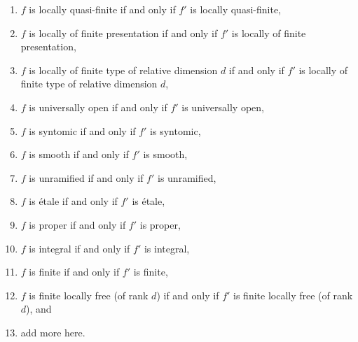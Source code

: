\begin{lemma}
\begin{enumerate}
$f$ is locally of finite type if and only if $f'$ is locally of finite type,
\item $f$ is locally quasi-finite if and only if $f'$ is locally quasi-finite,
\label{spaces-more-morphisms-item-quasi-finite}
\item
\label{spaces-more-morphisms-item-finite-presentation}
$f$ is locally of finite presentation if and only if $f'$ is locally of
finite presentation,
\item
\label{spaces-more-morphisms-item-relative-dimension-d}
$f$ is locally of finite type of relative dimension $d$ if and only if
$f'$ is locally of finite type of relative dimension $d$,
\item $f$ is universally open if and only if $f'$ is universally open,
\label{spaces-more-morphisms-item-universally-open}
\item $f$ is syntomic if and only if $f'$ is syntomic,
\label{spaces-more-morphisms-item-syntomic}
\item $f$ is smooth if and only if $f'$ is smooth,
\label{spaces-more-morphisms-item-smooth}
\item $f$ is unramified if and only if $f'$ is unramified,
\label{spaces-more-morphisms-item-unramified}
\item $f$ is \'etale if and only if $f'$ is \'etale,
\label{spaces-more-morphisms-item-etale}
\item $f$ is proper if and only if $f'$ is proper,
\label{spaces-more-morphisms-item-proper}
\item $f$ is integral if and only if $f'$ is integral,
\label{spaces-more-morphisms-item-integral}
\item $f$ is finite if and only if $f'$ is finite,
\label{spaces-more-morphisms-item-finite}
\item
\label{spaces-more-morphisms-item-finite-locally-free}
$f$ is finite locally free (of rank $d$) if and only if $f'$
is finite locally free (of rank $d$), and
\item add more here.
\end{enumerate}
\end{lemma}

